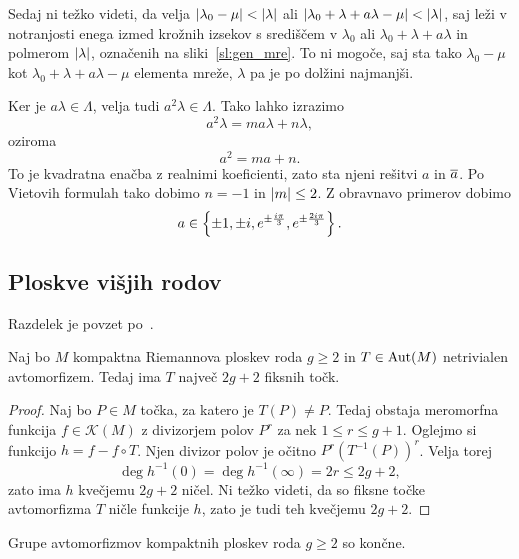 

Sedaj ni težko videti, da velja
$\left\lvert \lambda_0 - \mu\right\rvert < \left\lvert \lambda\right\rvert$ ali
$\left\lvert \lambda_0 + \lambda + a \lambda - \mu\right\rvert < \left\lvert \lambda\right\rvert$, saj
leži v notranjosti enega izmed krožnih izsekov s središčem v
$\lambda_0$ ali $\lambda_0 + \lambda + a \lambda$ in polmerom
$\left\lvert \lambda\right\rvert$, označenih na sliki~\ref{sl:gen_mre}. To ni mogoče,
saj sta tako $\lambda_0 - \mu$ kot
$\lambda_0 + \lambda + a \lambda - \mu$ elementa mreže, $\lambda$
pa je po dolžini najmanjši.

Ker je $a \lambda \in \Lambda$, velja tudi
$a^2 \lambda \in \Lambda$. Tako lahko izrazimo
\[
a^2 \lambda = m a \lambda + n \lambda,
\]
oziroma
\[
a^2 = ma + n.
\]
To je kvadratna enačba z realnimi koeficienti, zato sta njeni
rešitvi $a$ in $\overline{a}$. Po Vietovih formulah tako dobimo $n=-1$
in $\left\lvert m\right\rvert \leq 2$. Z obravnavo primerov dobimo
\[
a \in \left\{\pm 1, \pm i,
e^{\pm \frac{i \pi}{3}}, e^{\pm \frac{2i \pi}{3}}\right\}.
\]

\subsection{Ploskve višjih rodov}

Razdelek je povzet po~\cite[poglavje V.1]{Farkas_Kra_1980}.

\begin{trditev}
\label{td:fix_num}
Naj bo $M$ kompaktna Riemannova ploskev roda $g \geq 2$ in
$T \in \operatorname{Aut}(M)$ netrivialen avtomorfizem. Tedaj ima $T$ največ
$2g + 2$ fiksnih točk.
\end{trditev}

\begin{proof}
Naj bo $P \in M$ točka, za katero je $T(P) \ne P$. Tedaj obstaja
meromorfna funkcija $f \in \mathscr{K}(M)$ z divizorjem polov
$P^r$ za nek $1 \leq r \leq g + 1$. Oglejmo si funkcijo
$h = f - f \circ T$. Njen divizor polov je očitno
$P^r (T^{-1}(P))^r$. Velja torej
\[
\deg h^{-1}(0) = \deg h^{-1}(\infty) = 2r \leq 2g + 2,
\]
zato ima $h$ kvečjemu $2g + 2$ ničel. Ni težko videti, da so fiksne
točke avtomorfizma $T$ ničle funkcije $h$, zato je tudi teh
kvečjemu $2g + 2$.
\end{proof}

\begin{izrek}[Schwarz]
Grupe avtomorfizmov kompaktnih ploskev roda $g \geq 2$ so končne.
\end{izrek}

